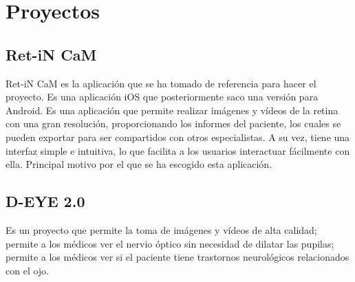 
\section{Proyectos}
    \subsection{Ret-iN CaM}
    Ret-iN CaM es la aplicación que se ha tomado de referencia para hacer el proyecto. Es una aplicación iOS que posteriormente saco una versión para Android. Es una aplicación que permite realizar imágenes y vídeos de la retina con una gran resolución, proporcionando los informes del paciente, los cuales se pueden exportar para ser compartidos con otros especialistas.
    A su vez, tiene una interfaz simple e intuitiva, lo que facilita a los usuarios interactuar fácilmente con ella. Principal motivo por el que se ha escogido esta aplicación.

    \subsection{D-EYE 2.0}
    Es un proyecto que permite la toma de imágenes y vídeos de alta calidad; permite a los médicos ver el nervio óptico sin necesidad de dilatar las pupilas; permite a los médicos ver si el paciente tiene trastornos neurológicos relacionados con el ojo.

\newpage

